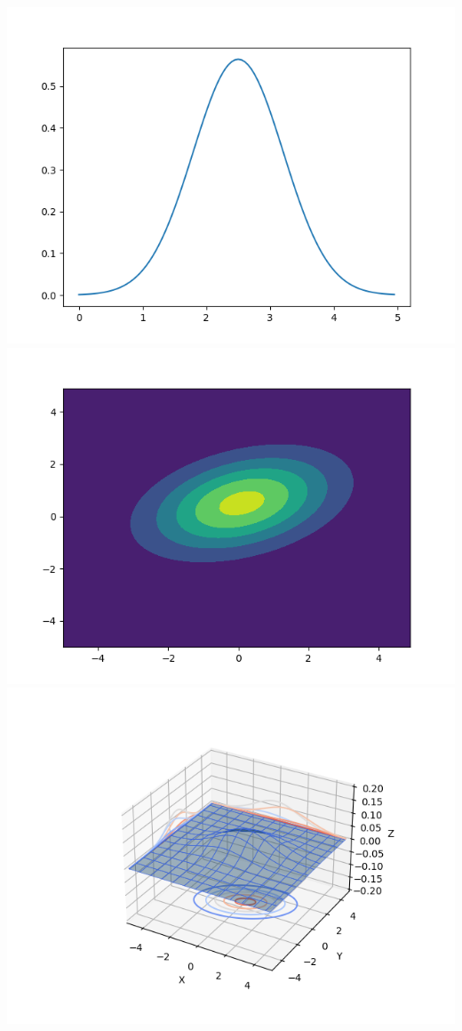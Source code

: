 \documentclass[
  letterpaper,
  DIV=11,
  numbers=noendperiod]{scrreprt}
\theoremstyle{plain}
\theoremstyle{definition}
\theoremstyle{remark}
\begin{document}
\includegraphics{Figure_4.png} \includegraphics{Figure_5.png}
\includegraphics{Figure_6.png}
\end{document}
